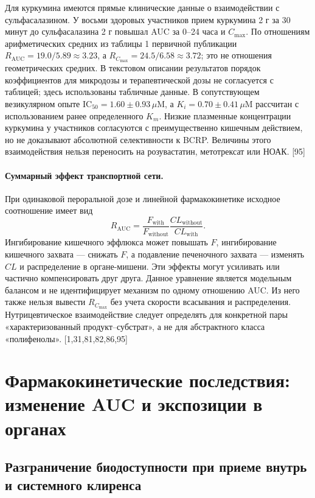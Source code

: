 \documentclass[11pt]{article}
\begin{document}
Для куркумина имеются прямые клинические данные о взаимодействии с сульфасалазином. У восьми здоровых участников прием куркумина 2 г за 30 минут до сульфасалазина 2 г повышал AUC за 0--24 часа и \(C_{\max}\). По отношениям арифметических средних из таблицы 1 первичной публикации \(R_{\mathrm{AUC}}=19.0/5.89\approx3.23\), а \(R_{C_{\max}}=24.5/6.58\approx3.72\); это не отношения геометрических средних. В текстовом описании результатов порядок коэффициентов для микродозы и терапевтической дозы не согласуется с таблицей; здесь использованы табличные данные. В сопутствующем везикулярном опыте \(\mathrm{IC}_{50}=1.60\pm0.93\,\mu\mathrm{M}\), а \(K_i=0.70\pm0.41\,\mu\mathrm{M}\) рассчитан с использованием ранее определенного \(K_m\). Низкие плазменные концентрации куркумина у участников согласуются с преимущественно кишечным действием, но не доказывают абсолютной селективности к BCRP. Величины этого взаимодействия нельзя переносить на розувастатин, метотрексат или НОАК. [95]

\paragraph{Суммарный эффект транспортной сети.}
При одинаковой пероральной дозе и линейной фармакокинетике исходное соотношение имеет вид
\[
R_{\mathrm{AUC}}=
\frac{F_{\mathrm{with}}}{F_{\mathrm{without}}}
\frac{CL_{\mathrm{without}}}{CL_{\mathrm{with}}}.
\]
Ингибирование кишечного эффлюкса может повышать \(F\), ингибирование кишечного захвата --- снижать \(F\), а подавление печеночного захвата --- изменять \(CL\) и распределение в органе-мишени. Эти эффекты могут усиливать или частично компенсировать друг друга. Данное уравнение является модельным балансом и не идентифицирует механизм по одному отношению AUC. Из него также нельзя вывести \(R_{C_{\max}}\) без учета скорости всасывания и распределения. Нутрицевтическое взаимодействие следует определять для конкретной пары «характеризованный продукт--субстрат», а не для абстрактного класса «полифенолы». [1,31,81,82,86,95]

\section{Фармакокинетические последствия: изменение AUC и экспозиции в органах}

\subsection{Разграничение биодоступности при приеме внутрь и системного клиренса}
\end{document}
